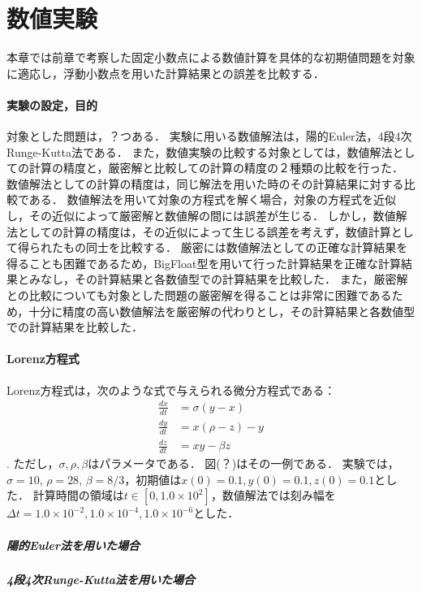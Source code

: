 \chapter{数値実験}
本章では前章で考察した固定小数点による数値計算を具体的な初期値問題を対象に適応し，浮動小数点を用いた計算結果との誤差を比較する．

\subsubsection{実験の設定，目的}
対象とした問題は，？つある．
実験に用いる数値解法は，陽的Euler法，4段4次Runge-Kutta法である．
また，数値実験の比較する対象としては，数値解法としての計算の精度と，厳密解と比較しての計算の精度の２種類の比較を行った．
数値解法としての計算の精度は，同じ解法を用いた時のその計算結果に対する比較である．
数値解法を用いて対象の方程式を解く場合，対象の方程式を近似し，その近似によって厳密解と数値解の間には誤差が生じる．
しかし，数値解法としての計算の精度は，その近似によって生じる誤差を考えず，数値計算として得られたもの同士を比較する．
厳密には数値解法としての正確な計算結果を得ることも困難であるため，BigFloat型を用いて行った計算結果を正確な計算結果とみなし，その計算結果と各数値型での計算結果を比較した．
また，厳密解との比較についても対象とした問題の厳密解を得ることは非常に困難であるため，十分に精度の高い数値解法を厳密解の代わりとし，その計算結果と各数値型での計算結果を比較した．

\subsubsection{Lorenz方程式}
Lorenz方程式は，次のような式で与えられる微分方程式である：
\begin{align}
    \frac{dx}{dt} &= \sigma(y-x) \\
    \frac{dy}{dt} &= x(\rho-z)-y \\
    \frac{dz}{dt} &= xy - \beta z
\end{align}.
ただし，$\sigma,\rho,\beta$はパラメータである．
図(？)はその一例である．
実験では，$\sigma=10$, $\rho=28$, $\beta=8/3$，初期値は$x(0) = 0.1, y(0) = 0.1, z(0) = 0.1$とした．
計算時間の領域は$t \in [0,1.0 \times 10^2]$，数値解法では刻み幅を$\Delta t =  1.0 \times 10^{-2},1.0 \times 10^{-4}, 1.0 \times 10^{-6}$とした．
\paragraph*{陽的Euler法を用いた場合}

\paragraph*{4段4次Runge-Kutta法を用いた場合}

